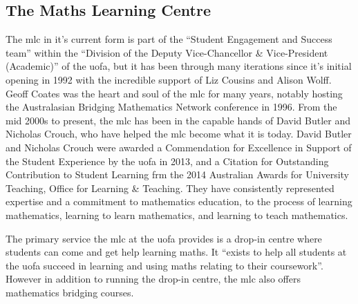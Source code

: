 \documentclass[twoside,12pt,a4paper]{report}
\begin{document}
\subsection{The Maths Learning Centre}

The \gls{mlc} in it's current form is part of the ``Student Engagement and Success team'' within the ``Division of the Deputy Vice-Chancellor \& Vice-President (Academic)'' of the \gls{uofa}, but it has been through many iterations since it's initial opening in 1992 with the incredible support of Liz Cousins and Alison Wolff. Geoff Coates was the heart and soul of the \gls{mlc} for many years, notably hosting the Australasian Bridging Mathematics Network conference in 1996. From the mid 2000s to present, the \gls{mlc} has been in the capable hands of David Butler and Nicholas Crouch, who have helped the \gls{mlc} become what it is today. David Butler and Nicholas Crouch were awarded a Commendation for Excellence in Support of the Student Experience by the \gls{uofa} in 2013, and a Citation for Outstanding Contribution to Student Learning frm the 2014 Australian Awards for University Teaching, Office for Learning \& Teaching. They have consistently represented expertise and a commitment to mathematics education, to the process of learning mathematics, learning to learn mathematics, and learning to teach mathematics. 

The primary service the \gls{mlc} at the \gls{uofa} provides is a drop-in centre where students can come and get help learning maths. It ``exists to help all students at the \gls{uofa} succeed in learning and using maths relating to their coursework''. However in addition to running the drop-in centre, the \gls{mlc} also offers mathematics bridging courses.
\end{document}
